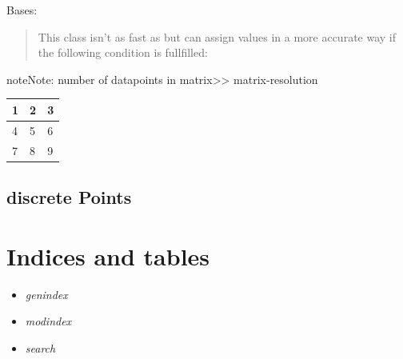 \documentclass[letterpaper,10pt,english]{sphinxmanual}
\begin{document}

\begin{fulllineitems}
\label{target:diaGrabber.target.fineMatrix}
Bases: 
\begin{quote}

This class isn't as fast as  but can assign values
in a more accurate way if the following condition is fullfilled:
\end{quote}

\begin{notice}{note}{Note:}
number of datapoints in matrix\textgreater{}\textgreater{} matrix-resolution
\end{notice}

\begin{tabulary}{\linewidth}{|L|L|L|}
\hline

1
 & 
2
 & 
3
\\\hline

4
 & 
5
 & 
6
\\\hline

7
 & 
8
 & 
9
\\\hline
\end{tabulary}


\end{fulllineitems}



\section{discrete Points}
\label{target:discrete-points}\label{target:module-diaGrabber.target.discretePoints}

\chapter{Indices and tables}
\label{index:indices-and-tables}\begin{itemize}
\item {} 
\emph{genindex}

\item {} 
\emph{modindex}

\item {} 
\emph{search}

\end{itemize}
\end{document}

